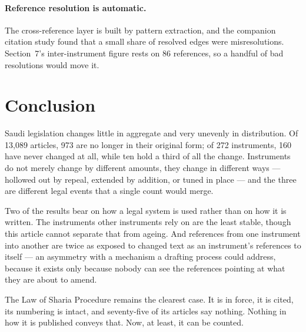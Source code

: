 \documentclass[11pt]{article}
\begin{document}
\paragraph{Reference resolution is automatic.} The cross-reference layer is
built by pattern extraction, and the companion citation study found that a
small share of resolved edges were misresolutions. Section~7's
inter-instrument figure rests on 86 references, so a handful of bad
resolutions would move it.

\section{Conclusion}

Saudi legislation changes little in aggregate and very unevenly in
distribution. Of 13,089 articles, 973 are no longer in their original form; of
272 instruments, 160 have never changed at all, while ten hold a third of all
the change. Instruments do not merely change by different amounts, they change
in different ways --- hollowed out by repeal, extended by addition, or tuned in
place --- and the three are different legal events that a single count would
merge.

Two of the results bear on how a legal system is used rather than on how it is
written. The instruments other instruments rely on are the least stable, though
this article cannot separate that from ageing. And references from one
instrument into another are twice as exposed to changed text as an
instrument's references to itself --- an asymmetry with a mechanism a drafting
process could address, because it exists only because nobody can see the
references pointing at what they are about to amend.

The Law of Sharia Procedure remains the clearest case. It is in force, it is
cited, its numbering is intact, and seventy-five of its articles say nothing.
Nothing in how it is published conveys that. Now, at least, it can be counted.
\end{document}
